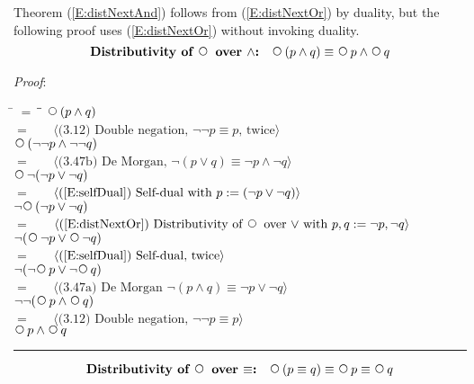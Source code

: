 \documentclass[12pt, fleqn, leqno]{article}
\newcommand{\lgap}{2pt}                             %
\newcommand{\mymathindent}{24pt}                    %
\newcommand{\Next}{\;\,\text{\raisebox{3.5pt}{\circle{6}}}}
\newcommand{\myqed}{\rule[-.23ex]{1.2ex}{2.0ex}}
\newcommand{\myqedtab}{\hspace{384pt}}              %
\newcommand{\Gll} {\langle}                         %
\newcommand{\Ggg} {\rangle}                         %
\newcommand{\Hint}[1]     {\ \ \ $\Gll              \mbox{#1} \Ggg$ }   %
\begin{document}
Theorem (\ref{E:distNextAnd}) follows from (\ref{E:distNextOr}) by  duality,
but the following proof uses (\ref{E:distNextOr}) without invoking duality.
\begin{equation}\label{E:distNextAnd}
\textbf{Distributivity of $\Next$ over $\land$:}\quad \Next (p \land q) \equiv \Next p \land \Next q
\end{equation}

\emph{Proof}:
\begin{tabbing}
\hspace{\mymathindent} \= $= \;$ \= \myqedtab \= \kill
  \> \>   $\Next (p \land q)$\\[\lgap]
  \> $=$  \>  \Hint{(3.12) Double negation, $\neg\neg p\equiv p$, twice}\\[\lgap]
  \> \>   $\Next (\neg\neg p \land \neg\neg q)$\\[\lgap]
  \> $=$  \>  \Hint{(3.47b) De Morgan, $\neg (p \lor q) \equiv \neg p \land \neg q$}\\[\lgap]
  \> \>   $\Next\neg(\neg p \lor \neg q)$\\[\lgap]
  \> $=$  \>  \Hint{(\ref{E:selfDual}) Self-dual with $p:= (\neg p \lor \neg q$)}\\[\lgap]
  \> \>   $\neg\Next (\neg p \lor \neg q)$\\[\lgap]
  \> $=$  \>  \Hint{(\ref{E:distNextOr}) Distributivity of $\Next$ over $\lor$ with $p,q := \neg p, \neg q$}\\[\lgap]
  \> \>   $\neg (\Next\neg p \lor \Next \neg q)$\\[\lgap]
  \> $=$  \>  \Hint{(\ref{E:selfDual}) Self-dual, twice}\\[\lgap]
  \> \>   $\neg(\neg\Next p \lor \neg\Next q)$\\[\lgap]
  \> $=$  \>  \Hint{(3.47a) De Morgan $\neg (p \land q) \equiv \neg p \lor \neg q$}\\[\lgap]
  \> \>   $\neg\neg(\Next p \land \Next q)$\\[\lgap]
  \> $=$  \>  \Hint{(3.12) Double negation, $\neg\neg p\equiv p$}\\[\lgap]
  \> \>   $\Next p \land \Next q$ \quad \myqed
\end{tabbing}
\begin{equation}\label{E:distNextEquiv}
\textbf{Distributivity of $\Next$ over $\equiv$:}\quad \Next (p \equiv q) \equiv \Next p \equiv \Next q
\end{equation}
\end{document}
